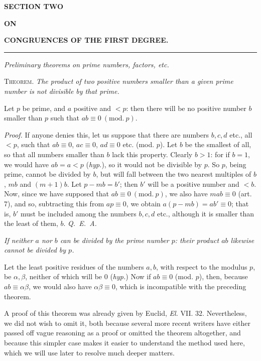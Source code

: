 \begin{center}
{\large\bfseries SECTION TWO}\par\bigskip
{\small\bfseries ON}\par\bigskip
{\large\bfseries CONGRUENCES OF THE FIRST DEGREE.}
\end{center}
\begin{center}\rule{0.09\linewidth}{0.3pt}\end{center}
\begin{center}\emph{Preliminary theorems on prime numbers, factors, etc.}\end{center}
\textsc{Theorem}. \emph{The product of two positive numbers smaller than a given prime number is not divisible by that prime.}

Let $p$ be prime, and $a$ positive and $<p$: then there will be no positive number $b$ smaller than $p$ such that $ab\equiv 0\ (\mathrm{mod.}\ p)$.

\emph{Proof.} If anyone denies this, let us suppose that there are numbers $b, c, d$ etc., all $<p$, such that $ab\equiv 0$, $ac\equiv 0$, $ad\equiv 0$ etc. (mod. $p$). Let $b$ be the smallest of all, so that all numbers smaller than $b$ lack this property. Clearly $b>1$: for if $b=1$, we would have $ab=a<p$ (\emph{hyp.}), so it would not be divisible by $p$. So $p$, being prime, cannot be divided by $b$, but will fall between the two nearest multiples of $b$, $mb$ and $(m+1)b$. Let $p-mb=b'$; then $b'$ will be a positive number and $<b$. Now, since we have supposed that $ab\equiv 0\ (\mathrm{mod.}\ p)$, we also have $mab\equiv 0$ (art. 7), and so, subtracting this from $ap\equiv 0$, we obtain $a(p-mb)=ab'\equiv 0$; that is, $b'$ must be included among the numbers $b, c, d$ etc., although it is smaller than the least of them, $b$. \emph{Q.~E.~A.}

\emph{If neither $a$ nor $b$ can be divided by the prime number $p$: their product $ab$ likewise cannot be divided by $p$.}

Let the least positive residues of the numbers $a, b$, with respect to the modulus $p$, be $\alpha, \beta$, neither of which will be $0$ (\emph{hyp.}) Now if $ab\equiv 0$ (mod. $p$), then, because $ab\equiv\alpha\beta$, we would also have $\alpha\beta\equiv 0$, which is incompatible with the preceding theorem.

A proof of this theorem was already given by Euclid, \emph{El.} VII. 32. Nevertheless, we did not wish to omit it, both because several more recent writers have either passed off vague reasoning as a proof or omitted the theorem altogether, and because this simpler case makes it easier to understand the method used here, which we will use later to resolve much deeper matters.

